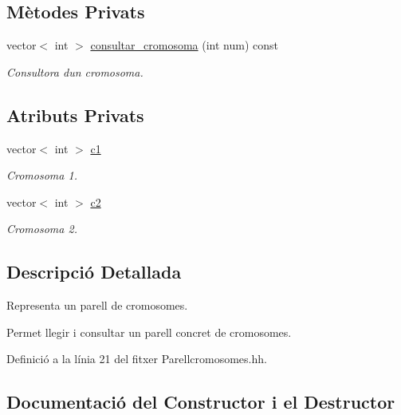 \subsection*{Mètodes Privats}
\begin{DoxyCompactItemize}
\item 
vector$<$ int $>$ \hyperlink{class_parell__cromosomes_ac031fd24ba85d2bc3384afaf6c81ac23}{consultar\+\_\+cromosoma} (int num) const 
\begin{DoxyCompactList}\small\item\em Consultora d\textquotesingle{}un cromosoma. \end{DoxyCompactList}\end{DoxyCompactItemize}
\subsection*{Atributs Privats}
\begin{DoxyCompactItemize}
\item 
vector$<$ int $>$ \hyperlink{class_parell__cromosomes_ab7f48c884531da8e1fe3a08d80235c9a}{c1}
\begin{DoxyCompactList}\small\item\em Cromosoma 1. \end{DoxyCompactList}\item 
vector$<$ int $>$ \hyperlink{class_parell__cromosomes_a6e3169a9ca8b8d508ce1c0143a5b4a82}{c2}
\begin{DoxyCompactList}\small\item\em Cromosoma 2. \end{DoxyCompactList}\end{DoxyCompactItemize}


\subsection{Descripció Detallada}
Representa un parell de cromosomes. 

Permet llegir i consultar un parell concret de cromosomes. 

Definició a la línia 21 del fitxer Parellcromosomes.\+hh.



\subsection{Documentació del Constructor i el Destructor}
